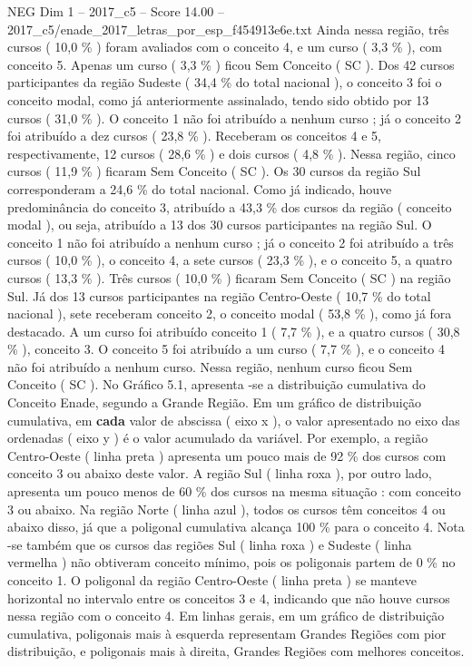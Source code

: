 \begin{textsample}{NEG Dim 1 – 2017\_c5 – Score 14.00 – 2017\_c5/enade\_2017\_letras\_por\_esp\_f454913e6e.txt}
Ainda nessa região, três cursos ( 10,0 \% ) foram avaliados com o conceito 4, e um curso ( 3,3 \% ), com conceito 5.
Apenas um curso ( 3,3 \% ) ficou Sem Conceito ( SC ).
Dos 42 cursos participantes da região Sudeste ( 34,4 \% do total nacional ), o conceito 3 foi o conceito modal, como já anteriormente assinalado, tendo sido obtido por 13 cursos ( 31,0 \% ).
O conceito 1 não foi atribuído a nenhum curso ; já o conceito 2 foi atribuído a dez cursos ( 23,8 \% ).
Receberam os conceitos 4 e 5, respectivamente, 12 cursos ( 28,6 \% ) e dois cursos ( 4,8 \% ).
Nessa região, cinco cursos ( 11,9 \% ) ficaram Sem Conceito ( SC ).
Os 30 cursos da região Sul corresponderam a 24,6 \% do total nacional.
Como já indicado, houve predominância do conceito 3, atribuído a 43,3 \% dos cursos da região ( conceito modal ), ou seja, atribuído a 13 dos 30 cursos participantes na região Sul.
O conceito 1 não foi atribuído a nenhum curso ; já o conceito 2 foi atribuído a três cursos ( 10,0 \% ), o conceito 4, a sete cursos ( 23,3 \% ), e o conceito 5, a quatro cursos ( 13,3 \% ).
Três cursos ( 10,0 \% ) ficaram Sem Conceito ( SC ) na região Sul.
Já dos 13 cursos participantes na região Centro-Oeste ( 10,7 \% do total nacional ), sete receberam conceito 2, o conceito modal ( 53,8 \% ), como já fora destacado.
A um curso foi atribuído conceito 1 ( 7,7 \% ), e a quatro cursos ( 30,8 \% ), conceito 3.
O conceito 5 foi atribuído a um curso ( 7,7 \% ), e o conceito 4 não foi atribuído a nenhum curso.
Nessa região, nenhum curso ficou Sem Conceito ( SC ).
No Gráfico 5.1, apresenta -se a distribuição cumulativa do Conceito Enade, segundo a Grande Região.
Em um gráfico de distribuição cumulativa, em \textbf{cada} valor de abscissa ( eixo x ), o valor apresentado no eixo das ordenadas ( eixo y ) é o valor acumulado da variável.
Por exemplo, a região Centro-Oeste ( linha preta ) apresenta um pouco mais de 92 \% dos cursos com conceito 3 ou abaixo deste valor.
A região Sul ( linha roxa ), por outro lado, apresenta um pouco menos de 60 \% dos cursos na mesma situação : com conceito 3 ou abaixo.
Na região Norte ( linha azul ), todos os cursos têm conceitos 4 ou abaixo disso, já que a poligonal cumulativa alcança 100 \% para o conceito 4.
Nota -se também que os cursos das regiões Sul ( linha roxa ) e Sudeste ( linha vermelha ) não obtiveram conceito mínimo, pois os poligonais partem de 0 \% no conceito 1.
O poligonal da região Centro-Oeste ( linha preta ) se manteve horizontal no intervalo entre os conceitos 3 e 4, indicando que não houve cursos nessa região com o conceito 4.
Em linhas gerais, em um gráfico de distribuição cumulativa, poligonais mais à esquerda representam Grandes Regiões com pior distribuição, e poligonais mais à direita, Grandes Regiões com melhores conceitos.

\end{textsample}
